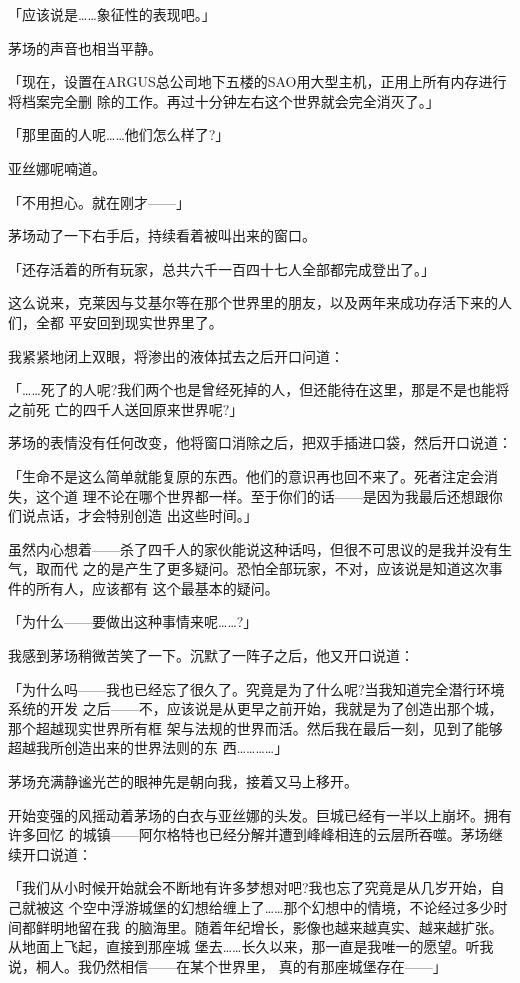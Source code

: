 \documentclass[11pt]{book}
\begin{document}
「应该说是……象征性的表现吧。」

茅场的声音也相当平静。

「现在，设置在ARGUS总公司地下五楼的SAO用大型主机，正用上所有内存进行将档案完全删
除的工作。再过十分钟左右这个世界就会完全消灭了。」

「那里面的人呢……他们怎么样了?」

亚丝娜呢喃道。

「不用担心。就在刚才——」

茅场动了一下右手后，持续看着被叫出来的窗口。

「还存活着的所有玩家，总共六千一百四十七人全部都完成登出了。」

这么说来，克莱因与艾基尔等在那个世界里的朋友，以及两年来成功存活下来的人们，全都
平安回到现实世界里了。

我紧紧地闭上双眼，将渗出的液体拭去之后开口问道：

「……死了的人呢?我们两个也是曾经死掉的人，但还能待在这里，那是不是也能将之前死
亡的四千人送回原来世界呢?」

茅场的表情没有任何改变，他将窗口消除之后，把双手插进口袋，然后开口说道：

「生命不是这么简单就能复原的东西。他们的意识再也回不来了。死者注定会消失，这个道
理不论在哪个世界都一样。至于你们的话——是因为我最后还想跟你们说点话，才会特别创造
出这些时间。」

虽然内心想着——杀了四千人的家伙能说这种话吗，但很不可思议的是我并没有生气，取而代
之的是产生了更多疑问。恐怕全部玩家，不对，应该说是知道这次事件的所有人，应该都有
这个最基本的疑问。

「为什么——要做出这种事情来呢……?」

我感到茅场稍微苦笑了一下。沉默了一阵子之后，他又开口说道：

「为什么吗——我也已经忘了很久了。究竟是为了什么呢?当我知道完全潜行环境系统的开发
之后——不，应该说是从更早之前开始，我就是为了创造出那个城，那个超越现实世界所有框
架与法规的世界而活。然后我在最后一刻，见到了能够超越我所创造出来的世界法则的东
西…………」

茅场充满静谧光芒的眼神先是朝向我，接着又马上移开。

开始变强的风摇动着茅场的白衣与亚丝娜的头发。巨城已经有一半以上崩坏。拥有许多回忆
的城镇——阿尔格特也已经分解并遭到峰峰相连的云层所吞噬。茅场继续开口说道：

「我们从小时候开始就会不断地有许多梦想对吧?我也忘了究竟是从几岁开始，自己就被这
个空中浮游城堡的幻想给缠上了……那个幻想中的情境，不论经过多少时间都鲜明地留在我
的脑海里。随着年纪增长，影像也越来越真实、越来越扩张。从地面上飞起，直接到那座城
堡去……长久以来，那一直是我唯一的愿望。听我说，桐人。我仍然相信——在某个世界里，
真的有那座城堡存在——」
\end{document}

